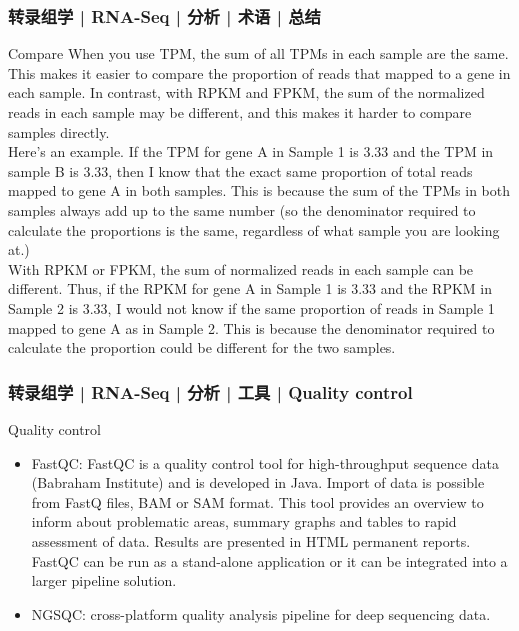 \begin{frame}
  \frametitle{转录组学 | RNA-Seq | 分析 | 术语 | 总结}
  {\footnotesize
  \begin{block}{Compare}
    When you use TPM, the sum of all TPMs in each sample are the same. This makes it easier to compare the proportion of reads that mapped to a gene in each sample. In contrast, with RPKM and FPKM, the sum of the normalized reads in each sample may be different, and this makes it harder to compare samples directly.\\
    \vspace{0.5em}
    Here's an example. If the TPM for gene A in Sample 1 is 3.33 and the TPM in sample B is 3.33, then I know that the exact same proportion of total reads mapped to gene A in both samples. This is because the sum of the TPMs in both samples always add up to the same number (so the denominator required to calculate the proportions is the same, regardless of what sample you are looking at.)\\
    \vspace{0.5em}
    With RPKM or FPKM, the sum of normalized reads in each sample can be different. Thus, if the RPKM for gene A in Sample 1 is 3.33 and the RPKM in Sample 2 is 3.33, I would not know if the same proportion of reads in Sample 1 mapped to gene A as in Sample 2. This is because the denominator required to calculate the proportion could be different for the two samples.
  \end{block}
  }
\end{frame}

\begin{frame}
  \frametitle{转录组学 | RNA-Seq | 分析 | 工具 | Quality control}
  \begin{block}{Quality control}
    \begin{itemize}
      \item FastQC: FastQC is a quality control tool for high-throughput sequence data (Babraham Institute) and is developed in Java. Import of data is possible from FastQ files, BAM or SAM format. This tool provides an overview to inform about problematic areas, summary graphs and tables to rapid assessment of data. Results are presented in HTML permanent reports. FastQC can be run as a stand-alone application or it can be integrated into a larger pipeline solution.
      \item NGSQC: cross-platform quality analysis pipeline for deep sequencing data.
    \end{itemize}
  \end{block}
\end{frame}

